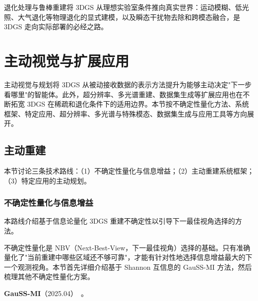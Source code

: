 \begin{takeaway}
退化处理与鲁棒重建将 3DGS 从理想实验室条件推向真实世界：运动模糊、低光照、大气退化等物理退化的显式建模，以及瞬态干扰物去除和跨模态融合，是 3DGS 走向实际部署的必经之路。
\end{takeaway}

\section{主动视觉与扩展应用}
\label{sec:12_active}

主动视觉与规划将 3DGS 从被动接收数据的表示方法提升为能够主动决定"下一步看哪里"的智能体。此外，超分辨率、多光谱重建、数据集生成等扩展应用也在不断拓宽 3DGS 在稀疏和退化条件下的适用边界。本节按不确定性量化方法、系统框架、特定应用、超分辨率、多光谱与特殊模态、数据集生成与应用工具等方向展开。

\subsection{主动重建}
\label{ss:12_4a}

本节讨论三条技术路线：（1）不确定性量化与信息增益；（2）主动重建系统框架；（3）特定应用的主动规划。

\subsubsection{不确定性量化与信息增益}

本路线介绍基于信息论量化 3DGS 重建不确定性以引导下一最佳视角选择的方法。

不确定性量化是 NBV（Next-Best-View，下一最佳视角）选择的基础。只有准确量化了"当前重建中哪些区域还不够可靠"，才能有针对性地选择信息增益最大的下一个观测视角。本节首先详细介绍基于 Shannon 互信息的 GauSS-MI 方法，然后梳理其他不确定性量化方案。

\textbf{GauSS-MI}（2025.04）~\cite{2504_21067}。

